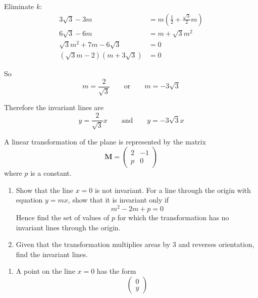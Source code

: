 \documentclass[leqno]{article}
\begin{document}
\begin{enumerate}[
  label=\textbf{\arabic*.},
  leftmargin=*,
  topsep=0pt,
  partopsep=0pt,
  parsep=0pt
]
\begin{djsSolution}
\begin{enumerate}[label=\textbf{(\alph*)}]
Eliminate \(k\):
\begin{align*}
3\sqrt3-3m &= m\left(\frac12+\frac{\sqrt3}{2}m\right) \\
6\sqrt3-6m &= m+\sqrt3 m^2 \\
\sqrt3 m^2+7m-6\sqrt3 &=0 \\
(\sqrt3 m-2)(m+3\sqrt3)&=0
\end{align*}

So
\[
m=\frac{2}{\sqrt3}
\qquad\text{or}\qquad
m=-3\sqrt3
\]

Therefore the invariant lines are
\[
y=\frac{2}{\sqrt3}x
\qquad\text{and}\qquad
y=-3\sqrt3 x
\]
\end{enumerate}
\end{djsSolution}


\newpage

\questionitem

A linear transformation of the plane is represented by the matrix
\[
\mathbf{M}=\begin{pmatrix}2 & -1\\ p & 0\end{pmatrix}
\]
where $p$ is a constant. \\
\begin{enumerate}[label=\textbf{(\alph*)}]
  \item Show that the line $x=0$ is not invariant. For a line through the origin with equation $y=mx$, show that it is invariant only if
  \[
  m^2-2m+p=0
  \]
  Hence find the set of values of $p$ for which the transformation has no invariant lines through the origin. \\
  \item Given that the transformation multiplies areas by $3$ and reverses orientation, find the invariant lines.  \\
\end{enumerate}

\vspace*{10pt}

\begin{djsSolution}
\begin{enumerate}[label=\textbf{(\alph*)}]
  \item A point on the line $x=0$ has the form
  \[
  \begin{pmatrix}0\\y\end{pmatrix}
  \]


\end{enumerate}
\end{djsSolution}
\end{enumerate}
\end{document}
